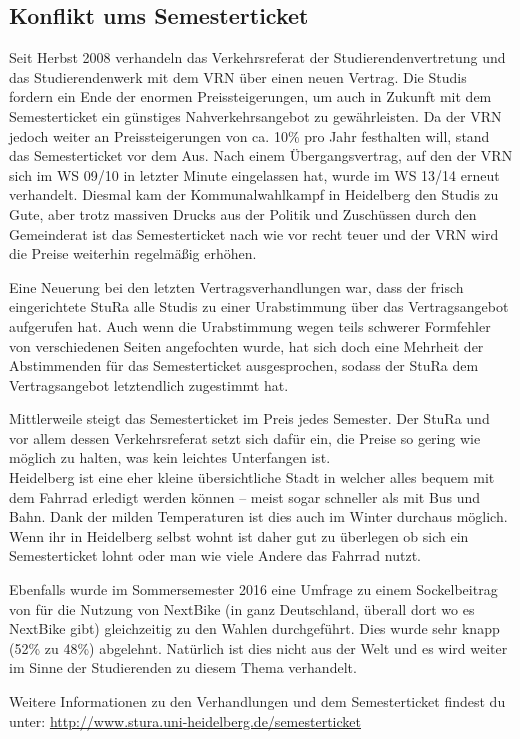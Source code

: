 \subsection{Konflikt ums Semesterticket}
Seit Herbst 2008 verhandeln das Verkehrsreferat der Studierendenvertretung und
das Studierendenwerk mit dem VRN über einen neuen Vertrag. Die Studis fordern ein
Ende der enormen Preissteigerungen, um auch in Zukunft mit dem Semesterticket
ein günstiges Nahverkehrsangebot zu gewährleisten. Da der VRN jedoch weiter an
Preissteigerungen von ca. 10\% pro Jahr festhalten will, stand das
Semesterticket vor dem Aus. 
Nach einem Übergangsvertrag, auf den der VRN sich im WS 09/10 in letzter Minute
eingelassen hat, wurde im WS 13/14 erneut verhandelt. Diesmal kam der
Kommunalwahlkampf in Heidelberg den Studis zu Gute, aber trotz massiven Drucks
aus der Politik und Zuschüssen durch den Gemeinderat ist das Semesterticket
nach wie vor recht teuer und der VRN wird die Preise weiterhin regelmäßig
erhöhen.

Eine Neuerung bei den letzten Vertragsverhandlungen war, dass der frisch
eingerichtete \gls{StuRa} alle Studis zu einer Urabstimmung über das
Vertragsangebot aufgerufen hat. Auch wenn die Urabstimmung wegen teils schwerer
Formfehler von verschiedenen Seiten angefochten wurde, hat sich doch eine
Mehrheit der Abstimmenden für das Semesterticket ausgesprochen, sodass der
StuRa dem Vertragsangebot letztendlich zugestimmt hat.

Mittlerweile steigt das Semesterticket im Preis jedes Semester. Der StuRa und
vor allem dessen Verkehrsreferat setzt sich dafür ein, die Preise so gering wie
möglich zu halten, was kein leichtes Unterfangen ist.\\[1em]

Heidelberg ist eine eher kleine übersichtliche Stadt in welcher alles bequem
mit dem Fahrrad erledigt werden können -- meist sogar schneller als mit Bus und
Bahn. Dank der milden Temperaturen ist dies auch im Winter durchaus möglich.
Wenn ihr in Heidelberg selbst wohnt ist daher gut zu überlegen ob sich ein
Semesterticket lohnt oder man wie viele Andere das Fahrrad nutzt.

Ebenfalls wurde im Sommersemester 2016 eine Umfrage zu einem Sockelbeitrag von
 für die Nutzung von NextBike (in ganz Deutschland, überall dort wo
es NextBike gibt) gleichzeitig zu den Wahlen durchgeführt. Dies wurde sehr
knapp (52\% zu 48\%) abgelehnt. Natürlich ist dies nicht aus der Welt und es
wird weiter im Sinne der Studierenden zu diesem Thema verhandelt.

Weitere Informationen zu den Verhandlungen und dem Semesterticket findest du
unter: \url{http://www.stura.uni-heidelberg.de/semesterticket}




